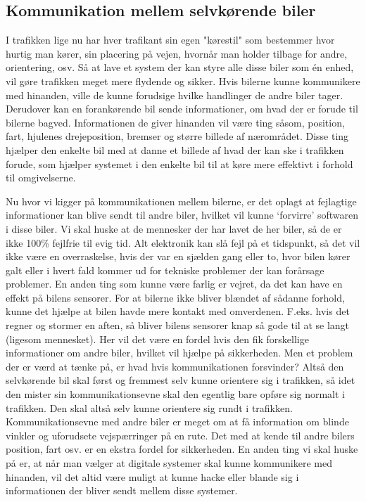 
\subsection{Kommunikation mellem selvkørende biler}

I trafikken lige nu har hver trafikant sin egen "kørestil" som bestemmer hvor hurtig man kører, sin placering på vejen, hvornår man holder tilbage for andre, orientering, osv.  Så at lave et system der kan styre alle disse biler som \'en enhed, vil gøre trafikken meget mere flydende og sikker. Hvis bilerne kunne kommunikere med hinanden, ville de kunne forudsige hvilke handlinger de andre biler tager. Derudover kan en forankørende bil sende informationer, om hvad der er forude til bilerne bagved. Informationen de giver hinanden vil være ting såsom, position, fart, hjulenes drejeposition, bremser og større billede af nærområdet. Disse ting hjælper den enkelte bil med at danne et billede af hvad der kan ske i trafikken forude, som hjælper systemet i den enkelte bil til at køre mere effektivt i forhold til omgivelserne. 

Nu hvor vi kigger på kommunikationen mellem bilerne, er det oplagt at fejlagtige informationer kan blive sendt til andre biler, hvilket vil kunne `forvirre' softwaren i disse biler. Vi skal huske at de mennesker der har lavet de her biler, så de er ikke 100\% fejlfrie til evig tid. Alt elektronik kan slå fejl på et tidspunkt, så det vil ikke være en overraskelse, hvis der var en sjælden gang eller to, hvor bilen kører galt eller i hvert fald kommer ud for tekniske problemer der kan forårsage problemer. En anden ting som kunne være farlig er vejret, da det kan have en effekt på bilens sensorer. For at bilerne ikke bliver blændet af sådanne forhold, kunne det hjælpe at bilen havde mere kontakt med omverdenen. F.eks. hvis det regner og stormer en aften, så bliver bilens sensorer knap så gode til at se langt (ligesom mennesket). Her vil det være en fordel hvis den fik forskellige informationer om andre biler, hvilket vil hjælpe på sikkerheden. Men et problem der er værd at tænke på, er hvad hvis kommunikationen forsvinder? Altså den selvkørende bil skal først og fremmest selv kunne orientere sig i trafikken, så idet den mister sin kommunikationsevne skal den egentlig bare opføre sig normalt i trafikken. Den skal altså selv kunne orientere sig rundt i trafikken. Kommunikationsevne med andre biler er meget om at få information om blinde vinkler og uforudsete vejspærringer på en rute. Det med at kende til andre bilers position, fart osv. er en ekstra fordel for sikkerheden. En anden ting vi skal huske på er, at når man vælger at digitale systemer skal kunne kommunikere med hinanden, vil det altid være muligt at kunne hacke eller blande sig i informationen der bliver sendt mellem disse systemer. \cite{car_to_car}

